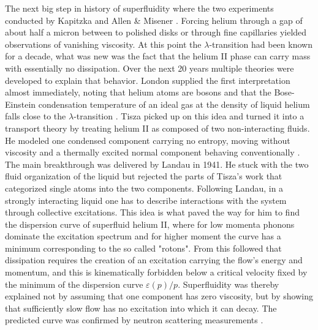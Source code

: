 The next big step in history of superfluidity where the two experiments conducted by Kapitzka \cite{kapitzaViscosityLiquidHelium1938} and Allen \& Misener \cite{allenFlowLiquidHelium1938}. Forcing helium through a gap of about half a micron between to polished disks or through fine capillaries yielded observations of vanishing viscosity. At this point the $\lambda$-transition had been known for a decade, what was new was the fact that the helium II phase can carry mass with essentially no dissipation. Over the next 20 years multiple theories were developed to explain that behavior. London supplied the first interpretation almost immediately, noting that helium atoms are bosons and that the Bose-Einstein condensation temperature of an ideal gas at the density of liquid helium falls close to the $\lambda$-transition \cite{londonLPhenomenonLiquidHelium1938}. Tisza picked up on this idea and turned it into a transport theory by treating helium II as composed of two non-interacting fluids. He modeled one condensed component carrying no entropy, moving without viscosity and a thermally excited normal component behaving conventionally \cite{tiszaTransportPhenomenaHelium1938,tiszaTheorieLiquidesQuantiques1940}. The main breakthrough was delivered by Landau in 1941. He stuck with the two fluid organization of the liquid but rejected the parts of Tisza's work that categorized single atoms into the two components. Following Landau, in a strongly interacting liquid one has to describe interactions with the system through collective excitations. This idea is what paved the way for him to find the dispersion curve of superfluid helium II, where for low momenta phonons dominate the excitation spectrum and for higher moment the curve has a minimum corresponding to the so called "rotons". From this followed that dissipation requires the creation of an excitation carrying the flow's energy and momentum, and this is kinematically forbidden below a critical velocity fixed by the minimum of the dispersion curve $\varepsilon(p)/p$. Superfluidity was thereby explained not by assuming that one component has zero viscosity, but by showing that sufficiently slow flow has no excitation into which it can decay. The predicted curve was confirmed by neutron scattering measurements \cite{henshawModesAtomicMotions1961}.

